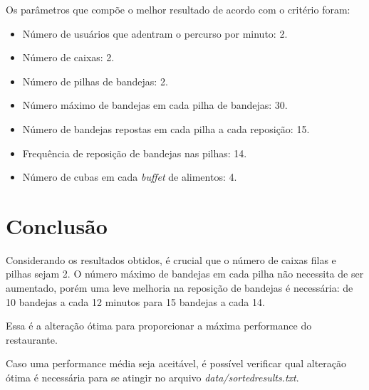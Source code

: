\documentclass{article}
\begin{document}
Os parâmetros que compõe o melhor resultado de acordo com o critério foram:
\begin{itemize}
  \setlength\itemsep{0px}
  \item Número de usuários que adentram o percurso por minuto: 2.
  \item Número de caixas: 2.
  \item Número de pilhas de bandejas: 2.
  \item Número máximo de bandejas em cada pilha de bandejas: 30.
  \item Número de bandejas repostas em cada pilha a cada reposição: 15.
  \item Frequência de reposição de bandejas nas pilhas: 14.
  \item Número de cubas em cada \textit{buffet} de alimentos: 4.
\end{itemize}

\section{Conclusão}
Considerando os resultados obtidos, é crucial que o número de caixas filas e pilhas sejam 2. O número máximo de bandejas em cada pilha não necessita de ser aumentado, porém uma leve melhoria na reposição de bandejas é necessária: de 10 bandejas a cada 12 minutos para 15 bandejas a cada 14.

Essa é a alteração ótima para proporcionar a máxima performance do restaurante.

Caso uma performance média seja aceitável, é possível verificar qual alteração ótima é necessária para se atingir no arquivo \textit{data/sorted\textunderscore results.txt}.
\end{document}

